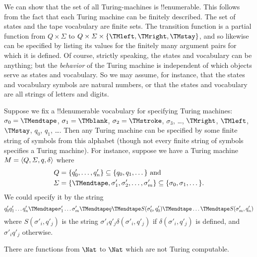 \documentclass[../../../include/open-logic-section]{subfiles}
\begin{document}

\begin{explain}
We can show that the set of all Turing-machines is
!!{enumerable}. This follows from the fact that each Turing machine
can be finitely described.  The set of states and the tape vocabulary
are finite sets.  The transition function is a partial function from
$Q \times \Sigma$ to $Q \times \Sigma \times \{\TMleft, \TMright,
\TMstay\}$, and so likewise can be specified by listing its values for
the finitely many argument pairs for which it is defined.  Of course,
strictly speaking, the states and vocabulary can be anything; but the
\emph{behavior} of the Turing machine is independent of which objects
serve as states and vocabulary. So we may assume, for instance, that
the states and vocabulary symbols are natural numbers, or that the
states and vocabulary are all strings of letters and digits.

Suppose we fix a !!{denumerable} vocabulary for specifying Turing
machines: $\sigma_0 = \TMendtape$, $\sigma_1 = \TMblank$, $\sigma_2 =
\TMstroke$, $\sigma_3$, \dots, $\TMright$, $\TMleft$, $\TMstay$,
$q_0$, $q_1$, \dots. Then any Turing machine can be specified by some
finite string of symbols from this alphabet (though not every finite
string of symbols specifies a Turing machine). For instance, suppose
we have a Turing machine $M = \langle Q, \Sigma, q, \delta \rangle$ where
\begin{align*}
  Q & =
  \{q'_0, \dots, q'_n\} \subseteq \{q_0, q_1, \dots \} \text{ and}\\
  \Sigma & = \{\TMendtape, \sigma'_1, \sigma'_2, \dots, \sigma'_m\}
  \subseteq \{\sigma_0, \sigma_1, \dots\}.
\end{align*}
We could specify it by the string
\[
q'_0 q'_1 \dots q'_n \TMendtape \sigma'_1 \dots \sigma'_m \TMendtape q
\TMendtape S(\sigma'_0,q'_0)\TMendtape \dots \TMendtape S(\sigma'_m, q'_n)
\]
where $S(\sigma'_i, q'_j) $ is the string $\sigma'_i q'_j
\delta(\sigma'_i, q'_j)$ if $\delta(\sigma'_i,q'_j)$ is defined, and
$\sigma'_i q'_j$ otherwise.
\end{explain}

\begin{thm}
There are functions from $\Nat$ to $\Nat$ which are not Turing
computable.
\end{thm}
\end{document}
